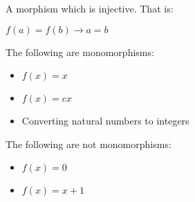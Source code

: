 A morphism which is injective. That is:

\(f(a)=f(b)\rightarrow a=b\)

The following are monomorphisms:

\begin{itemize}
\item \(f(x)=x\)
\item \(f(x)=cx\)
\item Converting natural numbers to integers
\end{itemize}

The following are not monomorphisms:

\begin{itemize}
\item \(f(x)=0\)
\item \(f(x)=x+1\)
\end{itemize}

